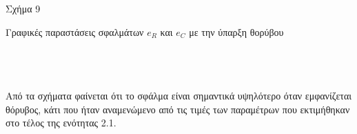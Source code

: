 \documentclass[12pt]{article}
\begin{document}
\\ \\
\centerline{Σχήμα 9}
\centerline{Γραφικές παραστάσεις σφαλμάτων $e_{R}$ και $e_{C}$ με την ύπαρξη θορύβου}
\\ \\ \\
Από τα σχήματα φαίνεται ότι το σφάλμα είναι σημαντικά υψηλότερο όταν εμφανίζεται θόρυβος, κάτι που ήταν αναμενώμενο από τις τιμές των παραμέτρων που εκτιμήθηκαν στο τέλος της ενότητας 2.1.
\end{document}
